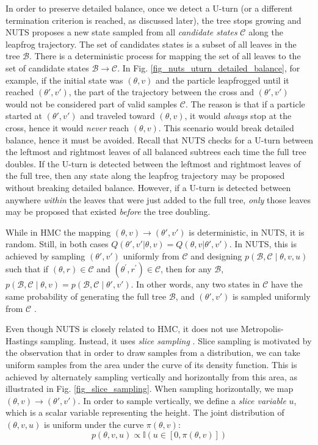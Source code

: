 \documentclass[12pt]{article}
\begin{document}
In order to preserve detailed balance, once we detect a U-turn (or a different termination criterion is reached, as discussed later), the tree stops growing and NUTS proposes a new state sampled from all \textit{candidate states} $\mathcal{C}$ along the leapfrog trajectory. The set of candidates states is a subset of all leaves in the tree $\mathcal{B}$. There is a deterministic process for mapping the set of all leaves to the set of candidate states $\mathcal{B} \rightarrow \mathcal{C}$. In Fig. \ref{fig_nuts_uturn_detailed_balance}, for example, if the initial state was $(\theta, v)$ and the particle leapfrogged until it reached $(\theta', v')$, the part of the trajectory between the cross and $(\theta', v')$ would not be considered part of valid samples $\mathcal{C}$. The reason is that if a particle started at $(\theta', v')$ and traveled toward $(\theta, v)$, it would \textit{always} stop at the cross, hence it would \textit{never} reach $(\theta, v)$. This scenario would break detailed balance, hence it must be avoided. Recall that NUTS checks for a U-turn between the leftmost and rightmost leaves of all balanced subtrees each time the full tree doubles. If the U-turn is detected between the leftmost and rightmost leaves of the full tree, then any state along the leapfrog trajectory may be proposed without breaking detailed balance. However, if a U-turn is detected between anywhere \textit{within} the leaves that were just added to the full tree, \textit{only} those leaves may be proposed that existed \textit{before} the tree doubling.

While in HMC the mapping $(\theta, v) \rightarrow (\theta', v')$ is deterministic, in NUTS, it is random. Still, in both cases $Q(\theta', v'|\theta, v) = Q(\theta, v|\theta', v')$. In NUTS, this is achieved by sampling $(\theta', v')$ uniformly from $\mathcal{C}$ and designing $p(\mathcal{B}, \mathcal{C} \mid \theta, v, u)$ such that if $(\theta, r) \in \mathcal{C}$ and $\left(\theta^{\prime}, r^{\prime}\right) \in \mathcal{C}$, then for any $\mathcal{B}$, $p(\mathcal{B}, \mathcal{C} \mid \theta, v)=p(\mathcal{B}, \mathcal{C} \mid \theta', v')$. In other words, any two states in $\mathcal{C}$ have the same probability of generating the full tree $\mathcal{B}$, and $(\theta', v')$ is sampled uniformly from $\mathcal{C}$ .

Even though NUTS is closely related to HMC, it does not use Metropolis-Hastings sampling. Instead, it uses \textit{slice sampling} \cite{slice_sampling}. Slice sampling is motivated by the observation that in order to draw samples from a distribution, we can take uniform samples from the area under the curve of its density function. This is achieved by alternately sampling vertically and horizontally from this area, as illustrated in Fig. \ref{fig_slice_sampling}. When sampling horizontally, we map $(\theta, v) \rightarrow (\theta', v')$. In order to sample vertically, we define a \textit{slice variable} $u$, which is a scalar variable representing the height. The joint distribution of $(\theta, v, u)$ is uniform under the curve $\pi(\theta, v)$:
\begin{equation}
p(\theta, v, u) \propto \mathbb{I}\left(u \in\left[0, \pi(\theta, v) \right]\right)
\end{equation}
\end{document}
